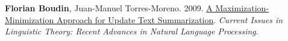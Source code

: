 \item 
\textbf{Florian Boudin}, Juan-Manuel Torres-Moreno.
2009.
\href{https://doi.org/10.1075/cilt.309.11bou}{A Maximization-Minimization Approach for Update Text Summarization}.
\textit{Current Issues in Linguistic Theory: Recent Advances in Natural Language Processing}.
\label{boudin-torres-moreno-2009-maximization}